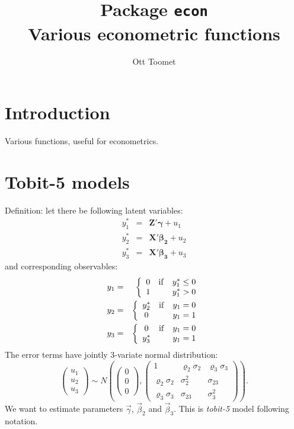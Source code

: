 \documentclass[a4paper]{article}
\title{Package \texttt{econ}\\
\normalsize Various econometric functions}
\author{Ott Toomet}
\begin{document}
\maketitle

\section{Introduction}

Various functions, useful for econometrics.

\section{Tobit-5 models}

Definition: let there be following latent variables:
\begin{eqnarray}
y_1^* &=& \bm{Z}'\bm{\gamma} + u_1\\
y_2^* &=& \bm{X}'\bm{\beta_2} + u_2\\
y_3^* &=& \bm{X}'\bm{\beta_3} + u_3
\end{eqnarray}
and corresponding observables:
\begin{eqnarray}
y_1 &=& \left\{
 \begin{array}{c@{\quad}l@{\quad}l}
 0     & \mathrm{if}  & y_1^* \le 0\\
 1     &              & y_1^* > 0
 \end{array} \right. \label{eq:tobit5_selection}\\
y_2 &=& \left\{
 \begin{array}{c@{\quad}l@{\quad}l}
 y_2^*  & \mathrm{if} & y_1 = 0\\
 0      &             & y_1 = 1
 \end{array} \right.\\
y_3 &=& \left\{
 \begin{array}{c@{\quad}l@{\quad}l}
 0      & \mathrm{if} & y_1 = 0\\
 y_3^*  &             & y_1 = 1
 \end{array}\right.
\end{eqnarray}
The error terms have jointly 3-variate normal distribution:
\begin{equation} \left(
 \begin{array}{c}
 u_1\\
 u_2\\
 u_3
 \end{array} \right) \sim N \left(
 \left( \begin{array}{c}
 0 \\
 0 \\
 0
 \end{array} \right),
 \left( \begin{array}{ccc}
 1                      & \varrho_2\sigma_2     & \varrho_3\sigma_3\\
 \varrho_2\sigma_2      & \sigma^2_2            & \sigma_{23}\\
 \varrho_3\sigma_3      & \sigma_{23}           & \sigma^2_3
 \end{array} \right) \right).
\end{equation}
We want to estimate parameters $\vec{\gamma}$, $\vec{\beta}_2$ and
$\vec{\beta}_3$.
This is \emph{tobit-5} model following \citet{amemiya1985} notation. 
\end{document}
